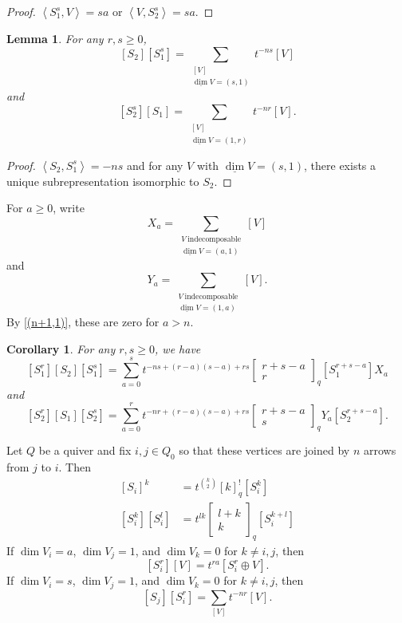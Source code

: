 \documentclass{book}
\newtheorem{lemma}[theorem]{Lemma}
\newtheorem{corollary}[theorem]{Corollary}
\begin{document}
    \begin{proof}
        $\left<S_1^s,V\right>=sa$ or $\left<V,S_2^s\right>=sa$.
    \end{proof}
    
    \begin{lemma}
        For any $r,s\geq 0$, \[\left[S_2\right]\left[S_1^s\right]=\sum_{\substack{[V]\\ \underline{\dim}V=(s,1)}}t^{-ns}[V]\] and \[\left[S_2^s\right]\left[S_1\right]=\sum_{\substack{[V]\\ \underline{\dim}V=(1,r)}}t^{-nr}[V].\]
    \end{lemma}
    
    \begin{proof}
        $\left<S_2,S_1^s\right>=-ns$ and for any $V$ with $\underline{\dim}V=(s,1)$, there exists a unique subrepresentation isomorphic to $S_2$.
    \end{proof}
    
    For $a\geq 0$, write \[X_a = \sum_{\substack{V\ \text{indecomposable} \\ \underline{\dim}V=(a,1)}}[V]\] and \[Y_a = \sum_{\substack{V\ \text{indecomposable} \\ \underline{\dim}V=(1,a)}}[V].\] By \eqref{(n+1,1)}, these are zero for $a>n$.
    
    \begin{corollary}
        For any $r,s\geq 0$, we have 
        \[\left[S_1^r\right]\left[S_2\right]\left[S_1^s\right]  = \sum_{a=0}^s t^{-ns+(r-a)(s-a)+rs}\begin{bmatrix}r+s-a\\ r\end{bmatrix}_q \left[S_1^{r+s-a}\right]X_a \]
            and \[\left[S_2^r\right]\left[S_1\right]\left[S_2^s\right]  = \sum_{a=0}^r t^{-nr+(r-a)(s-a)+rs}\begin{bmatrix}r+s-a\\ s\end{bmatrix}_q Y_a\left[S_2^{r+s-a}\right].\]
    \end{corollary}
   
    Let $Q$ be a quiver and fix $i,j\in Q_0$ so that these vertices are joined by $n$ arrows from $j$ to $i$. Then
    \begin{align*}
      \left[S_i\right]^k & =  t^{\binom{k}{2}}[k]_q^!\left[S_i^k\right]\\
       \left[S_i^k\right]\left[S_i^l\right] & =  t^{lk}\begin{bmatrix}l+k\\ k\end{bmatrix}_q\left[S_i^{k+l}\right]
    \end{align*}
    If $\dim V_i=a$, $\dim V_j=1$, and $\dim V_k=0$ for $k\neq i,j$, then 
    \[\left[S_i^r\right]\left[V\right]  =  t^{ra}\left[S_i^r\oplus V\right].\]
    If $\dim V_i=s$, $\dim V_j=1$, and $\dim V_k=0$ for $k\neq i,j$, then 
    \[\left[S_j\right]\left[S_i^r\right]  =  \sum_{[V]}t^{-nr}\left[V\right].\]
   
\end{document}
